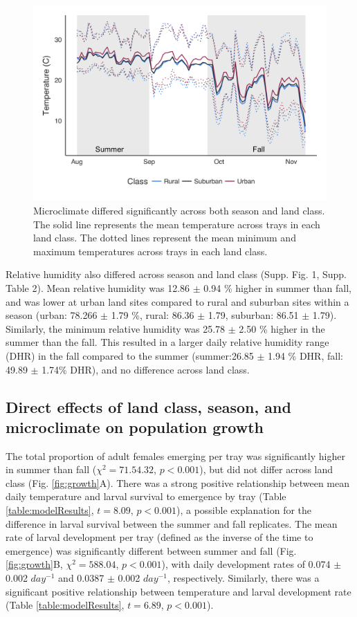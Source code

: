 \documentclass[12pt]{article}
\begin{document}
\begin{figure}
\centering\includegraphics[width=0.9\linewidth]{Figure2.png}
\caption{Microclimate differed significantly across both season and land class. The solid line represents the mean temperature across trays in each land class. The dotted lines represent the mean minimum and maximum temperatures across trays in each land class.}
\label{fig:temperature}
\end{figure}

Relative humidity also differed across season and land class (Supp. Fig. 1, Supp. Table 2). Mean relative humidity was 12.86 $\pm$ 0.94 \% higher in summer than fall, and was lower at urban land sites compared to rural and suburban sites within a season (urban: 78.266 $\pm$ 1.79 \%, rural: 86.36 $\pm$ 1.79, suburban: 86.51 $\pm$ 1.79). Similarly, the minimum relative humidity was 25.78 $\pm$ 2.50 \% higher in the summer than the fall. This resulted in a larger daily relative humidity range (DHR) in the fall compared to the summer (summer:26.85 $\pm$ 1.94 \% DHR, fall: 49.89 $\pm$ 1.74\% DHR), and no difference across land class.

\subsection{Direct effects of land class, season, and microclimate on population growth}

The total proportion of adult females emerging per tray was significantly higher in summer than fall ($\chi^2=71.54.32$, $p<0.001$), but did not differ across land class (Fig. \ref{fig:growth}A). There was a strong positive relationship between mean daily temperature and larval survival to emergence by tray (Table \ref{table:modelResults}, $t=8.09$, $p<0.001$), a possible explanation for the difference in larval survival between the summer and fall replicates. The mean rate of larval development per tray (defined as the inverse of the time to emergence) was significantly different between summer and fall (Fig. \ref{fig:growth}B, $\chi^2=588.04$, $p<0.001$), with daily development rates of 0.074 $\pm$ 0.002 $day^{-1}$ and 0.0387 $\pm$ 0.002 $day^{-1}$, respectively. Similarly, there was a significant positive relationship between temperature and larval development rate (Table \ref{table:modelResults}, $t=6.89$, $p<0.001$).
\end{document}
